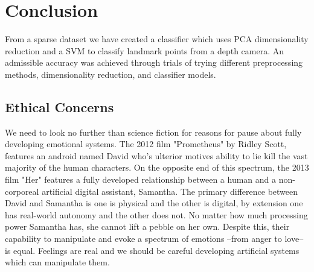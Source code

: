 \section{Conclusion}

From a sparse dataset we have created a classifier which uses PCA dimensionality reduction and a SVM to classify landmark points from a depth camera. An admissible accuracy was achieved through trials of trying different preprocessing methods, dimensionality reduction, and classifier models.

\subsection{Ethical Concerns}
We need to look no further than science fiction for reasons for pause about fully developing emotional systems. The 2012 film "Prometheus" by Ridley Scott, features an android named David who's ulterior motives ability to lie kill the vast majority of the human characters. On the opposite end of this spectrum, the 2013 film "Her" features a fully developed relationship between a human and a non-corporeal artificial digital assistant, Samantha. The primary difference between David and Samantha is one is physical and the other is digital, by extension one has real-world autonomy and the other does not. No matter how much processing power Samantha has, she cannot lift a pebble on her own. Despite this, their capability to manipulate and evoke a spectrum of emotions --from anger to love-- is equal. Feelings are real and we should be careful developing artificial systems which can manipulate them.
